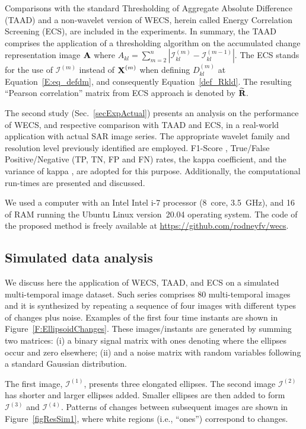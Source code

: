 \documentclass[journal]{IEEEtran}
\newcommand{\vA}{{\textbf A}}
\newcommand{\vR}{{\textbf R}}
\newcommand{\vX}{{\textbf X}}
\begin{document}
Comparisons with the standard Thresholding of Aggregate Absolute Difference (TAAD) and a non-wavelet version of WECS, herein called Energy Correlation Screening (ECS), are included in the experiments. 
In summary, the TAAD comprises the application of a thresholding algorithm on the accumulated change representation image $\vA$ where $A_{kl} = \sum_{m=2}^{n}|\mathcal{I}_{kl}^{(m)}-\mathcal{I}_{kl}^{(m-1)}|$. 
The ECS stands for the use of $\mathcal{I}^{(m)}$ instead of $\vX^{(m)}$ when defining $D_{kl}^{(m)}$ at Equation~\ref{E:eq_defdm}, and consequently Equation~\ref{def_Rkld}. The resulting ``Pearson correlation'' matrix from ECS approach is denoted by $\widetilde{\vR}$.


The second study (Sec.~\ref{secExpActual}) presents an analysis on the performance of WECS, and respective comparison with TAAD and ECS, in a real-world application with actual SAR image series. The appropriate wavelet family and resolution level previously identified are employed. 
F1-Score \cite{Rijsbergen1979}, True/False Positive/Negative (TP, TN, FP and FN) rates, the kappa coefficient, and the variance of kappa \cite{Congalton2019}, are adopted for this purpose. Additionally, the computational run-times are presented and discussed.



We used a computer with an Intel Intel i-7 processor (\SI{8}{core}, \SI{3.5}{\giga\hertz}), and \SI{16}{\giga\byte} of RAM running the Ubuntu Linux version~20.04 operating system.
The code of the proposed method is freely available at \url{https://github.com/rodneyfv/wecs}. 


\subsection{Simulated data analysis}\label{secExpSimulated}

We discuss here the application of  WECS, TAAD, and ECS on a simulated multi-temporal image dataset. 
Such series comprises 80 multi-temporal images and it is synthesized by repeating a sequence of four images with different types of changes plus noise. 
Examples of the first four time instants are shown in Figure~\ref{F:EllipsoidChanges}. 
These images/instants are generated by summing two matrices: (i) a binary signal matrix with ones denoting where the ellipses occur and zero elsewhere; (ii) and a noise matrix with random variables following a standard Gaussian distribution. 

The first image, $\mathcal{I}^{(1)}$, presents three elongated ellipses. The second image $\mathcal{I}^{(2)}$ has shorter and larger ellipses added. Smaller ellipses are then added to form $\mathcal{I}^{(3)}$ and $\mathcal{I}^{(4)}$. Patterns of changes between subsequent images are shown in Figure~\ref{figResSim1}, where white regions (i.e., ``ones'') correspond to changes.
\end{document}

